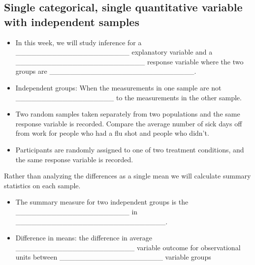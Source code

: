\documentclass[
]{report}
\begin{document}

\hypertarget{single-categorical-single-quantitative-variable-with-independent-samples}{%
\subsection{Single categorical, single quantitative variable with independent samples}\label{single-categorical-single-quantitative-variable-with-independent-samples}}


\begin{itemize}
\item
  In this week, we will study inference for a \_\_\_\_\_\_\_\_\_\_\_\_\_\_\_\_\_\_\_\_\_\_ explanatory variable and a \_\_\_\_\_\_\_\_\_\_\_\_\_\_\_\_\_\_\_\_\_\_\_\_\_ response variable where the two groups are \_\_\_\_\_\_\_\_\_\_\_\_\_\_\_\_\_\_\_\_\_\_\_\_\_\_\_\_.
\item
  Independent groups: When the measurements in one sample are not
  \_\_\_\_\_\_\_\_\_\_\_\_\_\_\_\_\_\_\_ to the measurements in the other sample.
\end{itemize}


\begin{itemize}
\item
  Two random samples taken separately from two populations and the same response variable is recorded. Compare the average number of sick days off from work for people who had a flu shot and people who didn't.
\item
  Participants are randomly assigned to one of two treatment conditions, and the same response variable is recorded.
\end{itemize}

Rather than analyzing the differences as a single mean we will calculate summary statistics on each sample.


\begin{itemize}
\item
  The summary measure for two independent groups is the \_\_\_\_\_\_\_\_\_\_\_\_\_\_\_\_\_\_\_\_\_\_ in \_\_\_\_\_\_\_\_\_\_\_\_\_\_\_\_\_\_\_\_\_\_\_\_\_\_\_\_\_.
\item
  Difference in means: the difference in average \_\_\_\_\_\_\_\_\_\_\_\_\_\_\_\_\_\_\_\_\_\_\_ variable outcome for observational units between \_\_\_\_\_\_\_\_\_\_\_\_\_\_\_\_\_\_\_\_ variable groups
\end{itemize}
\end{document}
